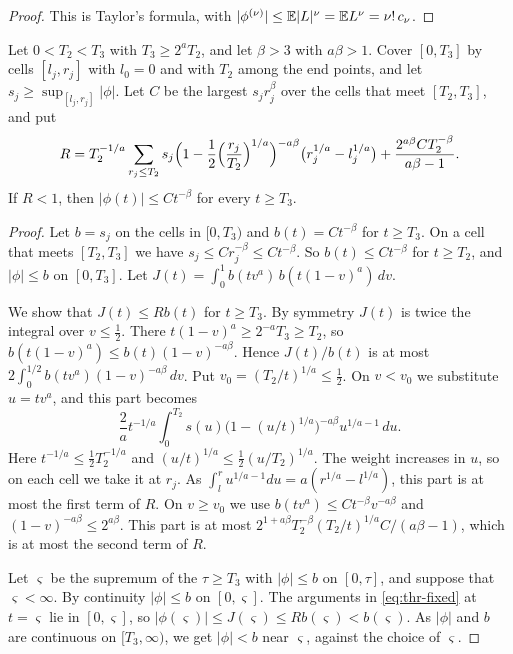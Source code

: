 \begin{proof}
This is Taylor's formula, with
$\lvert\phi^{(\nu)}\rvert\le\mathbb{E}\lvert L\rvert^\nu=\mathbb{E} L^\nu=\nu!\,c_\nu$.
\end{proof}

\begin{lemma}\label{lem:thr-tail}
Let $0<T_2<T_3$ with $T_3\ge2^aT_2$, and let $\beta>3$ with $a\beta>1$.
Cover $[0,T_3]$ by cells $[l_j,r_j]$ with $l_0=0$ and with $T_2$ among the
end points, and let $s_j\ge\sup_{[l_j,r_j]}\lvert\phi\rvert$. Let $C$ be the
largest $s_jr_j^\beta$ over the cells that meet $[T_2,T_3]$, and put
\[
 R=T_2^{-1/a}\sum_{r_j\le T_2}s_j
 \Bigl(1-\frac12\Bigl(\frac{r_j}{T_2}\Bigr)^{1/a}\Bigr)^{-a\beta}
 \bigl(r_j^{1/a}-l_j^{1/a}\bigr)+\frac{2^{a\beta}CT_2^{-\beta}}{a\beta-1} .
\]
If $R<1$, then $\lvert\phi(t)\rvert\le Ct^{-\beta}$ for every $t\ge T_3$.
\end{lemma}

\begin{proof}
Let $b=s_j$ on the cells in $[0,T_3)$ and $b(t)=Ct^{-\beta}$ for $t\ge T_3$.
On a cell that meets $[T_2,T_3]$ we have $s_j\le Cr_j^{-\beta}\le Ct^{-\beta}$.
So $b(t)\le Ct^{-\beta}$ for $t\ge T_2$, and $\lvert\phi\rvert\le b$ on
$[0,T_3]$. Let $J(t)=\int_0^1b(tv^a)\,b(t(1-v)^a)\,dv$.

We show that $J(t)\le Rb(t)$ for $t\ge T_3$. By symmetry $J(t)$ is twice the
integral over $v\le\frac12$. There $t(1-v)^a\ge2^{-a}T_3\ge T_2$, so
$b(t(1-v)^a)\le b(t)(1-v)^{-a\beta}$. Hence $J(t)/b(t)$ is at most
$2\int_0^{1/2}b(tv^a)(1-v)^{-a\beta}\,dv$. Put $v_0=(T_2/t)^{1/a}\le\frac12$.
On $v<v_0$ we substitute $u=tv^a$, and this part becomes
\[
 \frac2at^{-1/a}\int_0^{T_2}s(u)\bigl(1-(u/t)^{1/a}\bigr)^{-a\beta}
 u^{1/a-1}\,du .
\]
Here $t^{-1/a}\le\frac12T_2^{-1/a}$ and $(u/t)^{1/a}\le\frac12(u/T_2)^{1/a}$.
The weight increases in $u$, so on each cell we take it at $r_j$. As
$\int_l^ru^{1/a-1}du=a(r^{1/a}-l^{1/a})$, this part is at most the first term
of $R$. On $v\ge v_0$ we use $b(tv^a)\le Ct^{-\beta}v^{-a\beta}$ and
$(1-v)^{-a\beta}\le2^{a\beta}$. This part is at most
$2^{1+a\beta}T_2^{-\beta}(T_2/t)^{1/a}C/(a\beta-1)$, which is at most the
second term of $R$.

Let $\varsigma$ be the supremum of the $\tau\ge T_3$ with
$\lvert\phi\rvert\le b$ on $[0,\tau]$, and suppose that $\varsigma<\infty$. By
continuity $\lvert\phi\rvert\le b$ on $[0,\varsigma]$. The arguments in
\eqref{eq:thr-fixed} at $t=\varsigma$ lie in $[0,\varsigma]$, so
$\lvert\phi(\varsigma)\rvert\le J(\varsigma)\le Rb(\varsigma)<b(\varsigma)$.
As $\lvert\phi\rvert$ and $b$ are continuous on $[T_3,\infty)$, we get
$\lvert\phi\rvert<b$ near $\varsigma$, against the choice of $\varsigma$.
\end{proof}

